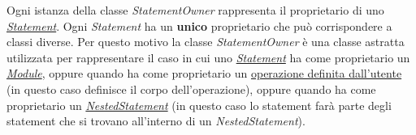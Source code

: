 
Ogni istanza della classe \textit{StatementOwner} rappresenta il proprietario di uno \hyperref[sec:modelstranslator:analysis:statements_analysis:statement]{\textit{Statement}}. Ogni \textit{Statement} ha un \textbf{unico} proprietario che può corrispondere a classi diverse. Per questo motivo la classe \textit{StatementOwner} è una classe astratta utilizzata per rappresentare il caso in cui uno \hyperref[sec:modelstranslator:analysis:statements_analysis:statement]{\textit{Statement}} ha come proprietario un \hyperref[sec:modelstranslator:analysis:model_analysis:module]{\textit{Module}}, oppure quando ha come proprietario un \hyperref[sec:modelstranslator:analysis:model_analysis:operation:userdefop]{operazione definita dall'utente} (in questo caso definisce il corpo dell'operazione), oppure quando ha come proprietario un \hyperref[sec:modelstranslator:analysis:statements_analysis:statement:nestedstatement]{\textit{NestedStatement}} (in questo caso lo statement farà parte degli statement che si trovano all'interno di un \textit{NestedStatement}).